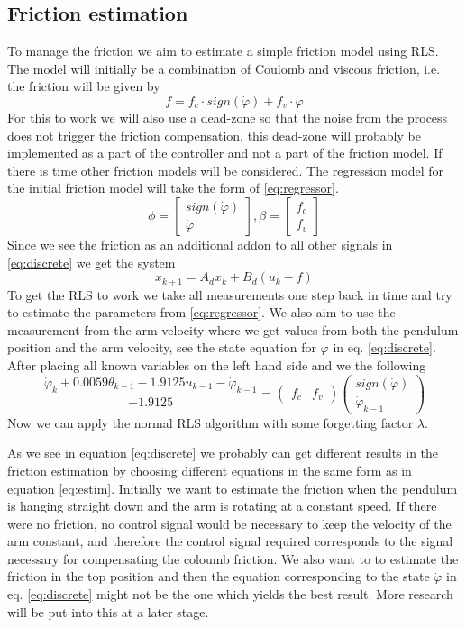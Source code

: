 \documentclass[10pt,a4paper]{article}
\begin{document}
\subsection{Friction estimation}
\label{sec:fricEst}
To manage the friction we aim to estimate a simple friction model using RLS. The model will initially be a combination of Coulomb and viscous friction, i.e. the friction will be given by $$f=f_c\cdot sign(\dot{\varphi})+f_v\cdot \dot{\varphi}$$
For this to work we will also use a dead-zone so that the noise from the process does not trigger the friction compensation, this dead-zone will probably be implemented as a part of the controller and not a part of the friction model. If there is time other friction models will be considered.
The regression model for the initial friction model will take the form of \ref{eq:regressor}.
\begin{equation}
\phi=\begin{bmatrix}
sign(\dot{\varphi})\\
\dot{\varphi} 
\end{bmatrix}, \beta = \begin{bmatrix}
f_c\\
f_v
\end{bmatrix}
\label{eq:regressor}
\end{equation}
Since we see the friction as an additional addon to all other signals in \ref{eq:discrete} we get the system
$$x_{k+1} = A_dx_k + B_d(u_k - f)$$
To get the RLS to work we take all measurements one step back in time and try to estimate the parameters from \ref{eq:regressor}. We also aim to use the measurement from the arm velocity where we get values from both the pendulum position and the arm velocity, see the state equation for $ \varphi $  in eq. \ref{eq:discrete}. After placing all known variables on the left hand side and we the following
\begin{equation}
\frac{\dot{\varphi}_k + 0.0059\theta_{k-1}-1.9125u_{k-1}-\dot{\varphi}_{k-1}}{-1.9125} = \begin{pmatrix}
f_c & f_v
\end{pmatrix}\begin{pmatrix}
sign(\dot{\varphi})\\
\dot{\varphi}_{k-1}
\end{pmatrix}
\label{eq:estim}
\end{equation}
Now we can apply the normal RLS algorithm with some forgetting factor $\lambda$.

As we see in equation \ref{eq:discrete} we probably can get different results in the friction estimation by choosing different equations in the same form as in equation \ref{eq:estim}. Initially we want to estimate the friction when the pendulum is hanging straight down and the arm is rotating at a constant speed. If there were no friction, no control signal would be necessary to keep the velocity of the arm constant, and therefore the control signal required corresponds to the signal necessary for compensating the coloumb friction.
We also want to to estimate the friction in the top position and then the equation corresponding to the state $ \dot{\varphi} $ in eq. \ref{eq:discrete} might not be the one which yields the best result. More research will be put into this at a later stage.
\end{document}
